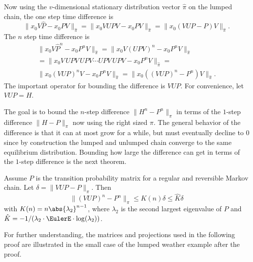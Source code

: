 \documentclass[12pt]{article}
\begin{document}
Now using the \( v \)-dimensional stationary distribution vector \( \hat
{\pi} \) on the lumped chain, the one step time difference is
\[
    \| x_0 V \hat{P} - x_0 P V \|_{\hat{\pi}} = \| x_0 V U P V - x_0 P V
    \|_{\hat{\pi}} = \| x_0 (VUP - P) V \|_{\hat{\pi}}.
\] The \( n \) step time difference is
\begin{multline*}
    \| x_0 V \hat{P}^n - x_0 P^n V \|_{\hat{\pi}} = \| x_0 V (U P V)^n -
    x_0 P^n V \|_{\hat{\pi}} \\
    = \| x_0 V\,UPV\,UPV \cdots UPV\,UPV - x_0 P^n V \|_{\hat{\pi}} = \\
    \| x_0 (VUP)^{n}V - x_0 P^n V \|_{\hat{\pi}} = \| x_0 ((VUP)^n - P^n)
    V \|_ {\hat{\pi}}.
\end{multline*}
The important operator for bounding the difference is \( VUP \).  For
convenience, let \( VUP = H \).

The goal is to bound the \( n \)-step difference \( \| H^n - P^n \|_{\pi}
\) in terms of the \( 1 \)-step difference \( \| H - P\|_{\pi} \) now
using the right sized \( \pi \).  The general behavior of the difference
is that it can at most grow for a while, but must eventually decline to \(
0 \) since by construction the lumped and unlumped chain converge to the
same equilibrium distribution.  Bounding how large the difference can
get in terms of the \( 1 \)-step difference is the next theorem.

\begin{theorem}
    \label{thm:lumpedchains:normdifference} Assume \( P \) is the
    transition probability matrix for a regular and reversible Markov
    chain.  Let \( \delta = \| VUP - P \|_{\pi} \). Then
    \[
        \| (VUP)^n - P^n \|_{\pi} \le K(n) \delta \le \hat{K} \delta
    \] with \( K(n) = n \abs{\lambda_2}^{n-1} \), where \( \lambda_2 \)
    is the second largest eigenvalue of \( P \) and \( \hat{K} = -1/(\lambda_2
    \cdot \EulerE \cdot \log(\lambda_2)) \).
\end{theorem}

\begin{remark}
    For further understanding, the matrices and projections used in the
    following proof are illustrated in the small case of the lumped
    weather example after the proof.
\end{remark}
\end{document}
